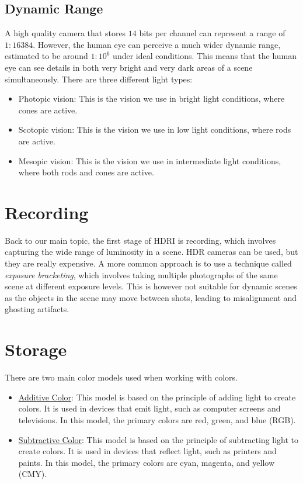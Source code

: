 \subsection{Dynamic Range}

A high quality camera that stores $14$ bits per channel can represent a range of $1:16384$. However, the human eye can perceive a much wider dynamic range, estimated to be around $1:10^6$ under ideal conditions. This means that the human eye can see details in both very bright and very dark areas of a scene simultaneously. There are three different light types:
\begin{itemize}
    \item Photopic vision: This is the vision we use in bright light conditions, where cones are active.
    \item Scotopic vision: This is the vision we use in low light conditions, where rods are active.
    \item Mesopic vision: This is the vision we use in intermediate light conditions, where both rods and cones are active.
\end{itemize}


\section{Recording}

Back to our main topic, the first stage of HDRI is recording, which involves capturing the wide range of luminosity in a scene. HDR cameras can be used, but they are really expensive. A more common approach is to use a technique called \emph{exposure bracketing}, which involves taking multiple photographs of the same scene at different exposure levels. This is however not suitable for dynamic scenes as the objects in the scene may move between shots, leading to misalignment and ghosting artifacts.

\section{Storage}

There are two main color models used when working with colors.
\begin{itemize}
    \item \ul{Additive Color}: This model is based on the principle of adding light to create colors. It is used in devices that emit light, such as computer screens and televisions. In this model, the primary colors are red, green, and blue (RGB).
    \item \ul{Subtractive Color}: This model is based on the principle of subtracting light to create colors. It is used in devices that reflect light, such as printers and paints. In this model, the primary colors are cyan, magenta, and yellow (CMY).
\end{itemize}

